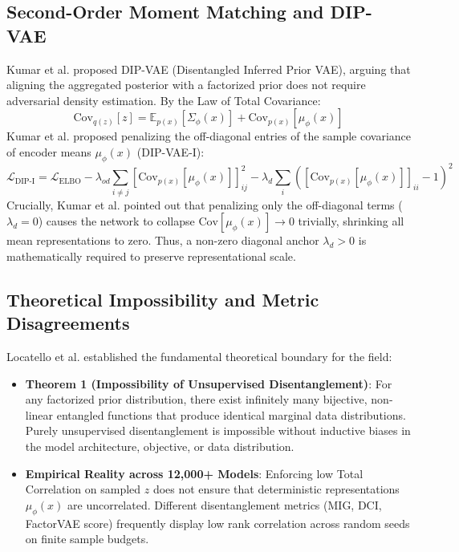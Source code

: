 \documentclass[11pt,a4paper]{article}
\begin{document}
\subsection{Second-Order Moment Matching and DIP-VAE}
Kumar et al. \cite{kumar2018variational} proposed DIP-VAE (Disentangled Inferred Prior VAE), arguing that aligning the aggregated posterior with a factorized prior does not require adversarial density estimation. By the Law of Total Covariance:
\begin{equation}
\text{Cov}_{q(z)}[z] = \mathbb{E}_{p(x)}[\Sigma_\phi(x)] + \text{Cov}_{p(x)}[\mu_\phi(x)]
\label{eq:total_cov}
\end{equation}
Kumar et al. proposed penalizing the off-diagonal entries of the sample covariance of encoder means $\mu_\phi(x)$ (DIP-VAE-I):
\begin{equation}
\mathcal{L}_{\text{DIP-I}} = \mathcal{L}_{\text{ELBO}} - \lambda_{od} \sum_{i \ne j} [\text{Cov}_{p(x)}[\mu_\phi(x)]]_{ij}^2 - \lambda_d \sum_i ([\text{Cov}_{p(x)}[\mu_\phi(x)]]_{ii} - 1)^2
\label{eq:dip_vae}
\end{equation}
Crucially, Kumar et al. pointed out that penalizing only the off-diagonal terms ($\lambda_d = 0$) causes the network to collapse $\text{Cov}[\mu_\phi(x)] \to 0$ trivially, shrinking all mean representations to zero. Thus, a non-zero diagonal anchor $\lambda_d > 0$ is mathematically required to preserve representational scale.

\subsection{Theoretical Impossibility and Metric Disagreements}
Locatello et al. \cite{locatello2019challenging} established the fundamental theoretical boundary for the field:
\begin{itemize}
    \item \textbf{Theorem 1 (Impossibility of Unsupervised Disentanglement)}: For any factorized prior distribution, there exist infinitely many bijective, non-linear entangled functions that produce identical marginal data distributions. Purely unsupervised disentanglement is impossible without inductive biases in the model architecture, objective, or data distribution.
    \item \textbf{Empirical Reality across 12,000+ Models}: Enforcing low Total Correlation on sampled $z$ does not ensure that deterministic representations $\mu_\phi(x)$ are uncorrelated. Different disentanglement metrics (MIG, DCI, FactorVAE score) frequently display low rank correlation across random seeds on finite sample budgets.
\end{itemize}
\end{document}
